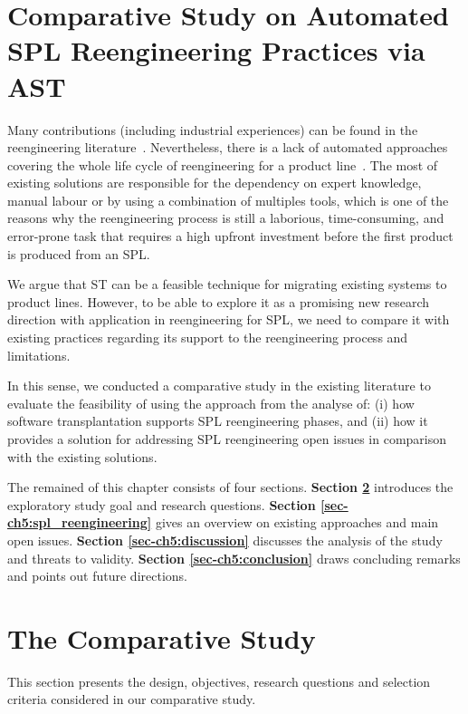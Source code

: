 \section{Comparative Study on Automated SPL Reengineering Practices via AST}{} \label{sec:comparative_study}

Many contributions (including industrial experiences) can be found in the reengineering literature~\cite{Assuncao2017}. Nevertheless,  there is a lack of automated approaches covering the whole life cycle of reengineering for a product line~\cite{Assuncao2017}. The most of existing solutions are responsible for the dependency on expert knowledge, manual labour or by using a combination of multiples tools, which is one of the reasons why the reengineering process is still a laborious, time-consuming, and error-prone task that requires a high upfront investment before the first product is produced from an SPL\cite{Krueger2001, Bastos2017, Assuncao2017}. 

We argue that ST can be a feasible technique for migrating existing systems to product lines. However, to be able to explore it as a promising new research direction with application in reengineering for SPL, we need to compare it with existing practices regarding its support to the reengineering process and limitations. 

In this sense, we conducted a comparative study in the existing literature to evaluate the feasibility of using the approach from the analyse of: (i) how software transplantation supports SPL reengineering phases, and (ii) how it provides a solution for addressing SPL reengineering open issues in comparison with the existing solutions.

The remained of this chapter consists of four sections. \textbf{Section \ref{sec-ch5:exploratory_study}} introduces the exploratory study goal and research questions. \textbf{Section \ref{sec-ch5:spl_reengineering}} gives an overview on existing approaches and main open issues. \textbf{Section \ref{sec-ch5:discussion}} discusses the analysis of the study and threats to validity. \textbf{Section \ref{sec-ch5:conclusion}} draws concluding remarks and points out future directions. 

\section{The Comparative Study} \label{sec-ch5:exploratory_study}
This section presents the design, objectives, research questions and selection criteria considered in our comparative study.


